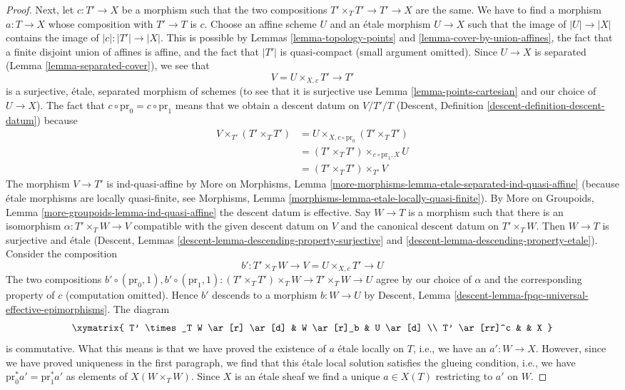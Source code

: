 \begin{proof}
\medskip\noindent
Next, let $c : T' \to X$ be a morphism such that the two compositions
$T' \times_T T' \to T' \to X$ are the same. We have to find a morphism
$a : T \to X$ whose composition with $T' \to T$ is $c$. Choose an
affine scheme $U$ and an \'etale morphism $U \to X$ such that the image
of $|U| \to |X|$ contains the image of $|c| : |T'| \to |X|$.
This is possible by Lemmas \ref{lemma-topology-points} and
\ref{lemma-cover-by-union-affines}, the fact that a finite disjoint union of
affines is affine, and the fact that $|T'|$ is quasi-compact
(small argument omitted). Since $U \to X$ is separated
(Lemma \ref{lemma-separated-cover}), we see that
$$
V = U \times_{X, c} T' \longrightarrow T'
$$
is a surjective, \'etale, separated morphism of schemes
(to see that it is surjective use Lemma \ref{lemma-points-cartesian}
and our choice of $U \to X$). The fact that
$c \circ \text{pr}_0 = c \circ \text{pr}_1$ means that we obtain a
descent datum on $V/T'/T$
(Descent, Definition \ref{descent-definition-descent-datum})
because
\begin{align*}
V \times_{T'} (T' \times_T T')
& =
U \times_{X, c \circ \text{pr}_0} (T' \times_T T') \\
& =
(T' \times_T T') \times_{c \circ \text{pr}_1, X} U \\
& =
(T' \times_T T') \times_{T'} V
\end{align*}
The morphism $V \to T'$ is ind-quasi-affine by
More on Morphisms, Lemma
\ref{more-morphisms-lemma-etale-separated-ind-quasi-affine}
(because \'etale morphisms are locally quasi-finite, see
Morphisms, Lemma \ref{morphisms-lemma-etale-locally-quasi-finite}).
By More on Groupoids, Lemma \ref{more-groupoids-lemma-ind-quasi-affine}
the descent datum is effective. Say $W \to T$ is a morphism
such that there is an isomorphism $\alpha : T' \times_T W \to V$
compatible with the given descent datum on $V$ and the canonical descent
datum on $T' \times_T W$. Then $W \to T$ is surjective and \'etale
(Descent, Lemmas \ref{descent-lemma-descending-property-surjective} and
\ref{descent-lemma-descending-property-etale}).
Consider the composition
$$
b' : T' \times_T W \longrightarrow V = U \times_{X, c} T' \longrightarrow U
$$
The two compositions
$b' \circ (\text{pr}_0, 1), 
b' \circ (\text{pr}_1, 1) :
(T' \times_T T') \times_T W \to T' \times_T W \to U$
agree by our choice of $\alpha$ and the corresponding property of $c$
(computation omitted). Hence $b'$ descends to a morphism $b : W \to U$ by
Descent, Lemma \ref{descent-lemma-fpqc-universal-effective-epimorphisms}.
The diagram
$$
\xymatrix{
T' \times_T W \ar[r] \ar[d] & W \ar[r]_b & U \ar[d] \\
T' \ar[rr]^c &  & X
}
$$
is commutative. What this means is that we have proved the existence
of $a$ \'etale locally on $T$, i.e., we have an $a' : W \to X$.
However, since we have proved uniqueness
in the first paragraph, we find that this \'etale local solution
satisfies the glueing condition, i.e., we have
$\text{pr}_0^*a' = \text{pr}_1^*a'$ as elements of $X(W \times_T W)$.
Since $X$ is an \'etale sheaf we find a unique $a \in X(T)$ restricting
to $a'$ on $W$.
\end{proof}
